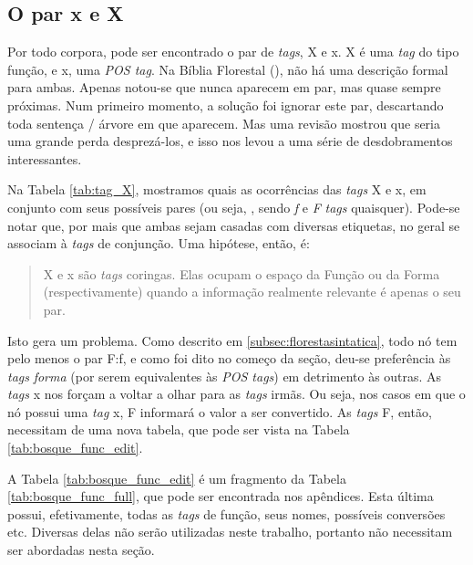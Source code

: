 \subsection{O par \textbf{x} e \textbf{X}}
\label{subsec:sec_x}
Por todo corpora, pode ser encontrado o par de \textit{tags}, X e x. X é uma \textit{tag} do tipo função, e x, uma \textit{POS tag}. Na Bíblia Florestal (), não há uma descrição formal para ambas. Apenas notou-se que nunca aparecem em par, mas quase sempre próximas. Num primeiro momento, a solução foi ignorar este par, descartando toda sentença / árvore em que aparecem. Mas uma revisão mostrou que seria uma grande perda desprezá-los, e isso nos levou a uma série de desdobramentos interessantes.
\begin{center}
    
\end{center}
Na Tabela \ref{tab:tag_X}, mostramos quais as ocorrências das \textit{tags} X e x, em conjunto com seus possíveis pares (ou seja, , sendo \textit{f} e \textit{F} \textit{tags} quaisquer). Pode-se notar que, por mais que ambas sejam casadas com diversas etiquetas, no geral se associam à \textit{tags} de conjunção. Uma hipótese, então, é:
\begin{quote}
	X e x são \textit{tags} coringas. Elas ocupam o espaço da Função ou da Forma (respectivamente) quando a informação realmente relevante é apenas o seu par. 
\end{quote}
Isto gera um problema. Como descrito em \ref{subsec:florestasintatica}, todo nó tem pelo menos o par F:f, e como foi dito no começo da seção, deu-se preferência às \textit{tags} \textit{forma} (por serem equivalentes às \textit{POS tags}) em detrimento às outras. As \textit{tags} x nos forçam a voltar a olhar para as \textit{tags} irmãs. Ou seja, nos casos em que o nó possui uma \textit{tag} x, F informará o valor a ser convertido. As \textit{tags} F, então, necessitam de uma nova tabela, que pode ser vista na Tabela \ref{tab:bosque_func_edit}.
\begin{center}
    
\end{center}
A Tabela \ref{tab:bosque_func_edit} é um fragmento da Tabela \ref{tab:bosque_func_full}, que pode ser encontrada nos apêndices. Esta última possui, efetivamente, todas as \textit{tags} de função, seus nomes, possíveis conversões etc. Diversas delas não serão utilizadas neste trabalho, portanto não necessitam ser abordadas nesta seção.

